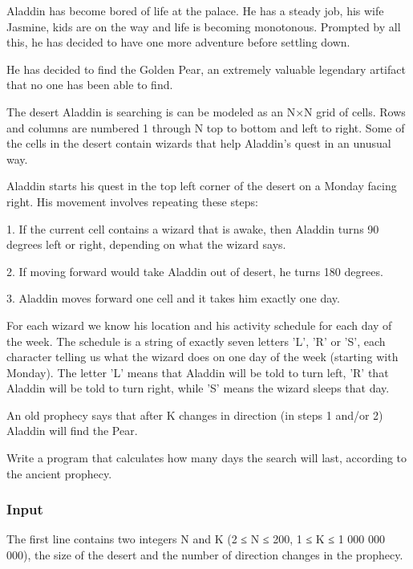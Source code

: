 



   Aladdin has become bored of life at the palace. He has a steady job, his wife Jasmine, kids are on the way and life is becoming monotonous. Prompted by all this, he has decided to have one more adventure before settling down.  

   He has decided to find the Golden Pear, an extremely valuable legendary artifact that no one has been able to find.  

   The desert Aladdin is searching is can be modeled as an N×N grid of cells. Rows and columns are numbered 1 through N top to bottom and left to right. Some of the cells in the desert contain wizards that help Aladdin's quest in an unusual way.  

   Aladdin starts his quest in the top left corner of the desert on a Monday facing right. His movement involves repeating these steps:  
\begin{itemize}

    1. If the current cell contains a wizard that is awake, then Aladdin turns 90 degrees left or right, depending on what the wizard says.   

    2. If moving forward would take Aladdin out of desert, he turns 180 degrees.   

    3. Aladdin moves forward one cell and it takes him exactly one day.   
\end{itemize}

   For each wizard we know his location and his activity schedule for each day of the week. The schedule is a string of exactly seven letters 'L', 'R' or 'S', each character telling us what the wizard does on one day of the week (starting with Monday). The letter 'L' means that Aladdin will be told to turn left, 'R' that Aladdin will be told to turn right, while 'S' means the wizard sleeps that day.  

   An old prophecy says that after K changes in direction (in steps 1 and/or 2) Aladdin will find the Pear.  

   Write a program that calculates how many days the search will last, according to the ancient prophecy.  

\subsubsection{   Input  }

   The first line contains two integers N and K (2 ≤ N ≤ 200, 1 ≤ K ≤ 1 000 000 000), the size of the desert and the number of direction changes in the prophecy.  


